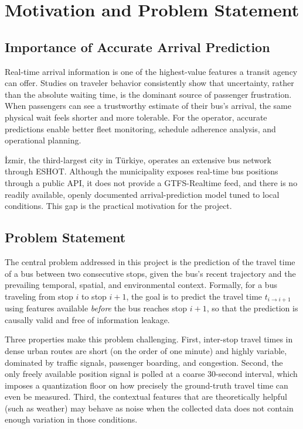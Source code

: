 \section{Motivation and Problem Statement}

\subsection{Importance of Accurate Arrival Prediction}

Real-time arrival information is one of the highest-value features a transit agency can offer. Studies on traveler behavior consistently show that uncertainty, rather than the absolute waiting time, is the dominant source of passenger frustration. When passengers can see a trustworthy estimate of their bus's arrival, the same physical wait feels shorter and more tolerable. For the operator, accurate predictions enable better fleet monitoring, schedule adherence analysis, and operational planning.

İzmir, the third-largest city in Türkiye, operates an extensive bus network through ESHOT. Although the municipality exposes real-time bus positions through a public API, it does not provide a GTFS-Realtime feed, and there is no readily available, openly documented arrival-prediction model tuned to local conditions. This gap is the practical motivation for the project.

\subsection{Problem Statement}

The central problem addressed in this project is the prediction of the travel time of a bus between two consecutive stops, given the bus's recent trajectory and the prevailing temporal, spatial, and environmental context. Formally, for a bus traveling from stop $i$ to stop $i+1$, the goal is to predict the travel time $t_{i \rightarrow i+1}$ using features available \emph{before} the bus reaches stop $i+1$, so that the prediction is causally valid and free of information leakage.

Three properties make this problem challenging. First, inter-stop travel times in dense urban routes are short (on the order of one minute) and highly variable, dominated by traffic signals, passenger boarding, and congestion. Second, the only freely available position signal is polled at a coarse 30-second interval, which imposes a quantization floor on how precisely the ground-truth travel time can even be measured. Third, the contextual features that are theoretically helpful (such as weather) may behave as noise when the collected data does not contain enough variation in those conditions.


